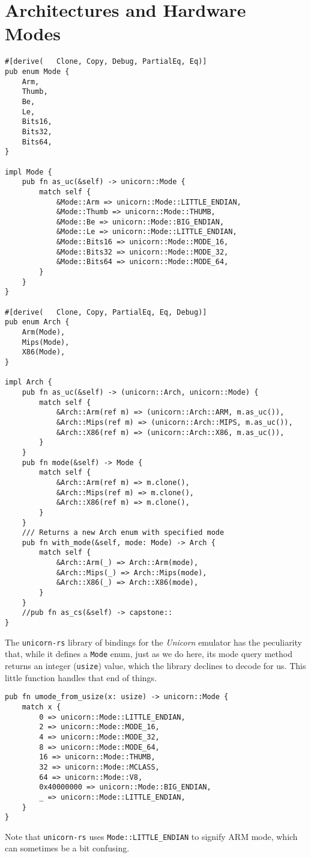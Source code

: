 \documentclass[11pt]{article}
\begin{document}
\section{Architectures and Hardware Modes}
\label{sec:orgc1db474}

\lstset{language=rust,label=org7d3b59e,caption= ,captionpos=b,numbers=none}
\begin{lstlisting}
#[derive(   Clone, Copy, Debug, PartialEq, Eq)]
pub enum Mode {
    Arm,
    Thumb,
    Be,
    Le,
    Bits16,
    Bits32,
    Bits64,
}

impl Mode {
    pub fn as_uc(&self) -> unicorn::Mode {
        match self {
            &Mode::Arm => unicorn::Mode::LITTLE_ENDIAN,
            &Mode::Thumb => unicorn::Mode::THUMB,
            &Mode::Be => unicorn::Mode::BIG_ENDIAN,
            &Mode::Le => unicorn::Mode::LITTLE_ENDIAN,
            &Mode::Bits16 => unicorn::Mode::MODE_16,
            &Mode::Bits32 => unicorn::Mode::MODE_32,
            &Mode::Bits64 => unicorn::Mode::MODE_64,
        }
    }
}

#[derive(   Clone, Copy, PartialEq, Eq, Debug)]
pub enum Arch {
    Arm(Mode),
    Mips(Mode),
    X86(Mode),
}

impl Arch {
    pub fn as_uc(&self) -> (unicorn::Arch, unicorn::Mode) {
        match self {
            &Arch::Arm(ref m) => (unicorn::Arch::ARM, m.as_uc()),
            &Arch::Mips(ref m) => (unicorn::Arch::MIPS, m.as_uc()),
            &Arch::X86(ref m) => (unicorn::Arch::X86, m.as_uc()),
        }
    }
    pub fn mode(&self) -> Mode {
        match self {
            &Arch::Arm(ref m) => m.clone(),
            &Arch::Mips(ref m) => m.clone(),
            &Arch::X86(ref m) => m.clone(),
        }
    }
    /// Returns a new Arch enum with specified mode
    pub fn with_mode(&self, mode: Mode) -> Arch {
        match self {
            &Arch::Arm(_) => Arch::Arm(mode),
            &Arch::Mips(_) => Arch::Mips(mode),
            &Arch::X86(_) => Arch::X86(mode),
        }
    }
    //pub fn as_cs(&self) -> capstone::
}
\end{lstlisting}


The \texttt{unicorn-rs} library of bindings for the \emph{Unicorn} emulator has
the peculiarity that, while it defines a \texttt{Mode} enum, just as we do
here, its mode query method returns an integer (\texttt{usize}) value, which
the library declines to decode for us. This little function handles
that end of things.
\lstset{language=rust,label=orge84fac4,caption= ,captionpos=b,numbers=none}
\begin{lstlisting}
pub fn umode_from_usize(x: usize) -> unicorn::Mode {
    match x {
        0 => unicorn::Mode::LITTLE_ENDIAN,
        2 => unicorn::Mode::MODE_16,
        4 => unicorn::Mode::MODE_32,
        8 => unicorn::Mode::MODE_64,
        16 => unicorn::Mode::THUMB,
        32 => unicorn::Mode::MCLASS,
        64 => unicorn::Mode::V8,
        0x40000000 => unicorn::Mode::BIG_ENDIAN,
        _ => unicorn::Mode::LITTLE_ENDIAN,
    }
}
\end{lstlisting}
Note that \texttt{unicorn-rs} uses \texttt{Mode::LITTLE\_ENDIAN} to signify ARM mode,
which can sometimes be a bit confusing.
\end{document}
